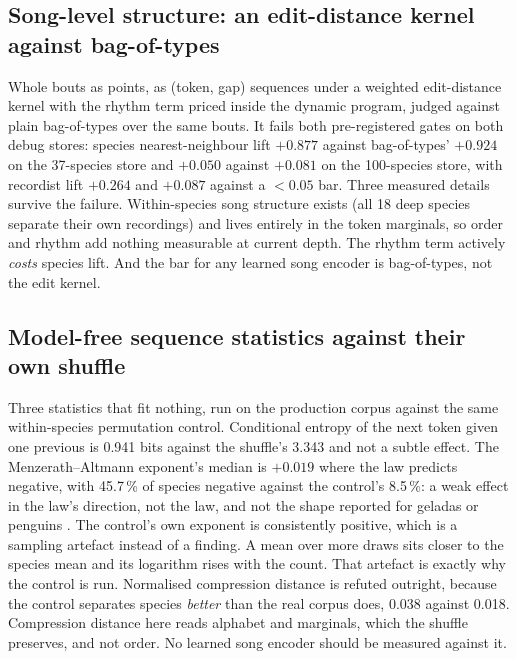 \documentclass[10pt,twocolumn,a4paper]{article}
\begin{document}
\subsection{Song-level structure: an edit-distance kernel against bag-of-types}

Whole bouts as points, as (token, gap) sequences under a weighted edit-distance kernel with
the rhythm term priced inside the dynamic program, judged against plain bag-of-types over
the same bouts. It fails both pre-registered gates on both debug stores: species
nearest-neighbour lift $+0.877$ against bag-of-types' $+0.924$ on the 37-species store and
$+0.050$ against $+0.081$ on the 100-species store, with recordist lift $+0.264$ and
$+0.087$ against a $<0.05$ bar. Three measured details survive the failure. Within-species
song structure exists (all 18 deep species separate their own recordings) and lives
entirely in the token marginals, so order and rhythm add nothing measurable at current
depth. The rhythm term actively \emph{costs} species lift. And the bar for any learned song
encoder is bag-of-types, not the edit kernel.

\subsection{Model-free sequence statistics against their own shuffle}

Three statistics that fit nothing, run on the production corpus against the same
within-species permutation control. Conditional entropy of the next token given one previous
is 0.941 bits against the shuffle's 3.343 and not a subtle effect. The Menzerath--Altmann
exponent's median is $+0.019$ where the law predicts negative, with 45.7\,\% of species
negative against the control's 8.5\,\%: a weak effect in the law's direction, not the law, and
not the shape reported for geladas or penguins \citep{gustison2016,favaro2020}. The control's
own exponent is consistently positive, which is a sampling artefact instead of a finding. A
mean over more draws sits closer to the species mean and its logarithm rises with the count.
That artefact is exactly why the control is run.
Normalised compression distance \citep{cilibrasi2005} is refuted outright, because the control
separates species \emph{better} than the real corpus does, 0.038 against 0.018.
Compression distance here reads alphabet and marginals, which the shuffle preserves, and
not order. No learned song encoder should be measured against it.
\end{document}
